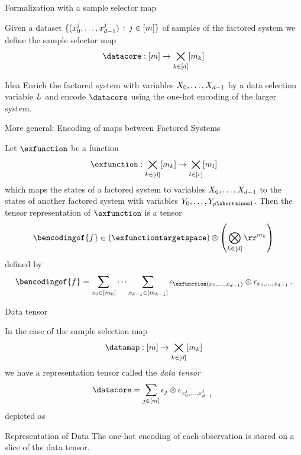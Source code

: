 \documentclass{beamer}
\begin{document}
\begin{frame}{Formalization with a sample selector map}

Given a dataset $\{({x_{0}^{j},\ldots,x_{d-1}^{j}}) \, : \, j\in[m] \}$ of samples of the factored system we define the sample selector map
	\[ \datacore : [\datanum] \rightarrow \facstates \]

\medskip

\begin{block}{Idea}
	Enrich the factored system with variables $X_{0},\ldots,X_{d-1}$ by a data selection variable $L$ and encode $\datacore$ using the one-hot encoding of the larger system.
\end{block}


\end{frame}


\begin{frame}{More general: Encoding of maps between Factored Systems}

\begin{definition}
	Let $\exfunction$ be a function
		\[ \exfunction : \facstates \rightarrow  \secfacstates \]
	which maps the states of a factored system to variables $X_{0},\ldots,X_{d-1}$ to the states of another factored system with variables $\seccatvariables$.
	Then the tensor representation of $\exfunction$ is a tensor
		\[ \bencodingof{\exformula} \in \left(\exfunctiontargetspace\right)  \otimes \left(\facspace\right) \]
	defined by
		\[ \bencodingof{\exformula} = \sum_{\catindexofin{0}} \cdots  \sum_{\catindexofin{\atomenumerator-1}}  \onehotmapof{\exfunction(\catindices)} \otimes \onehotmapof{\catindices} \, . \]
\end{definition}

\end{frame}



\begin{frame}{Data tensor}

In the case of the sample selection map
	\[ \datamap : [\datanum] \rightarrow \facstates \]
we have a representation tensor called the \emph{data tensor}
	\[ \datacore = \sum_{\datindexin} \onehotmapof{\datindex} \otimes \onehotmapof{\catindicesof{\datindex}} \,  \]
depicted as 
\begin{center}
	
\end{center}

\begin{block}{Representation of Data}
	The one-hot encoding of each observation is stored on a slice of the data tensor.
\end{block}

\end{frame}
\end{document}
